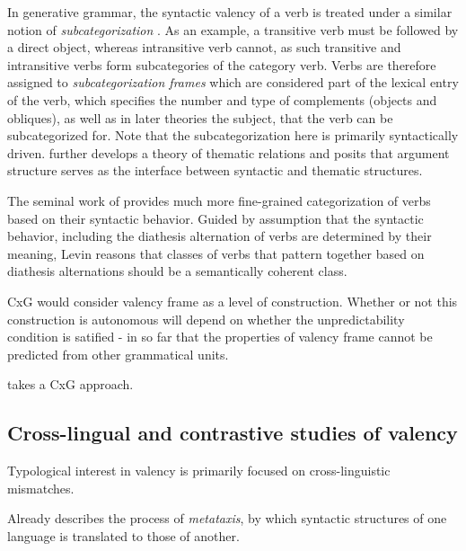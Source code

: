 In generative grammar, the syntactic valency of a verb is treated under a similar notion of \textit{subcategorization} \citep{chomsky1965a}. As an example, a transitive verb must be followed by a direct object, whereas intransitive verb cannot, as such transitive and intransitive verbs form subcategories of the category verb. Verbs are therefore assigned to \textit{subcategorization frames} which are considered part of the lexical entry of the verb, which specifies the number and type of complements (objects and obliques), as well as in later theories the subject, that the verb can be subcategorized for. Note that the subcategorization here is primarily syntactically driven. \citet{jackendoff1972,jackendoff1987,jackendoff1992} further develops a theory of thematic relations and posits that argument structure serves as the interface between syntactic and thematic structures.

The seminal work of \citet{levin1993} provides much more fine-grained categorization of verbs based on their syntactic behavior. Guided by assumption that the syntactic behavior, including the diathesis alternation of verbs are determined by their meaning, Levin reasons that classes of verbs that pattern together based on diathesis alternations should be a semantically coherent class. 

\citep{fillmore1967,fillmore1970} 

CxG would consider valency frame as a level of construction. Whether or not this construction is autonomous will depend on whether the unpredictability condition is satified - in so far that the properties of valency frame cannot be predicted from other grammatical units.

\citet{croft2012} takes a CxG approach. 


\subsection{Cross-lingual and contrastive studies of valency}

Typological interest in valency is primarily focused on cross-linguistic mismatches.

Already \citet{tesniere1959} describes the process of \textit{metataxis}, by which syntactic structures of one language is translated to those of another.  

